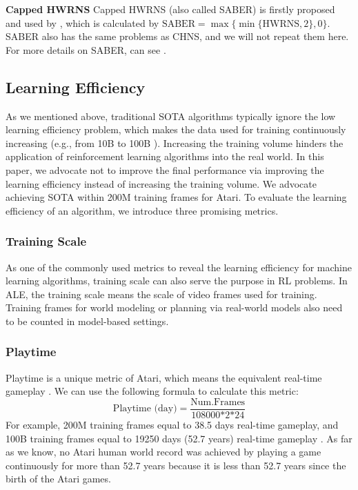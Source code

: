 \documentclass[nohyperref]{article}
\theoremstyle{plain}
\begin{document}
\textbf{Capped HWRNS} Capped HWRNS (also called SABER) is firstly proposed and used by \citep{atarihuman}, which is calculated by $\mathrm{SABER}=\max \{\min \{\mathrm{HWRNS}, 2\}, 0\}$. SABER also has the same problems as CHNS, and we will not repeat them here. For more details on SABER, can see \citep{atarihuman}.

\subsection{Learning Efficiency}
As we mentioned above, traditional SOTA algorithms typically ignore the low learning efficiency problem, which makes the data used for training continuously increasing (e.g., from 10B \citep{r2d2} to 100B \citep{agent57}). Increasing the training volume hinders the application of reinforcement learning algorithms into the real world. In this paper, we advocate not to improve the final performance via improving the learning efficiency instead of increasing the training volume. We advocate achieving SOTA within 200M training frames for Atari. To evaluate the learning efficiency of an algorithm, we introduce three promising metrics.

\subsubsection{Training Scale}
As one of the commonly used metrics to reveal the learning efficiency for machine learning algorithms, training scale can also serve the purpose in RL problems. In ALE, the training scale means the scale of video frames used for training. Training frames for world modeling or planning via real-world models also need to be counted in model-based settings.

\subsubsection{Playtime}
Playtime is a unique metric of Atari, which means the equivalent real-time gameplay \citep{ale2}. We can use the following formula to calculate this metric:
\begin{equation}
    \text{Playtime (day)} = \frac{\text{Num.Frames}}{\text{108000*2*24}}
\end{equation}
For example, 200M training frames equal to 38.5 days real-time gameplay, and 100B training frames equal to 19250 days (52.7 years) real-time gameplay \citep{agent57}. As far as we know, no Atari human world record was achieved by playing a game continuously for more than 52.7 years because it is less than 52.7 years since the birth of the Atari games.
\end{document}
